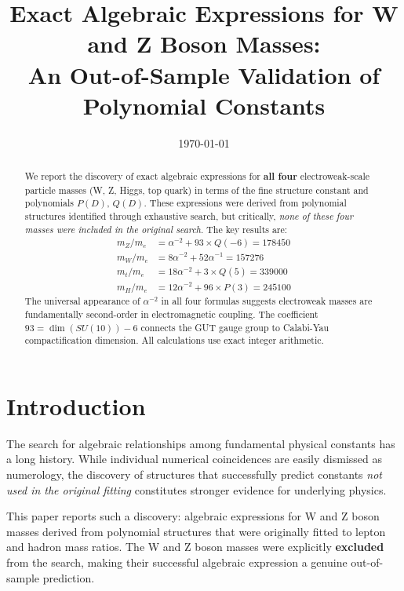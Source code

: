 \documentclass[11pt,a4paper]{article}
\title{Exact Algebraic Expressions for W and Z Boson Masses:\\
An Out-of-Sample Validation of Polynomial Constants}
\author{}
\date{\today}
\begin{document}
\maketitle

\begin{abstract}
We report the discovery of exact algebraic expressions for \textbf{all four} electroweak-scale particle masses (W, Z, Higgs, top quark) in terms of the fine structure constant and polynomials $P(D)$, $Q(D)$. These expressions were derived from polynomial structures identified through exhaustive search, but critically, \textit{none of these four masses were included in the original search}. The key results are:
\begin{align*}
m_Z/m_e &= \alpha^{-2} + 93 \times Q(-6) = 178450 \\
m_W/m_e &= 8\alpha^{-2} + 52\alpha^{-1} = 157276 \\
m_t/m_e &= 18\alpha^{-2} + 3 \times Q(5) = 339000 \\
m_H/m_e &= 12\alpha^{-2} + 96 \times P(3) = 245100
\end{align*}
The universal appearance of $\alpha^{-2}$ in all four formulas suggests electroweak masses are fundamentally second-order in electromagnetic coupling. The coefficient $93 = \dim(SU(10)) - 6$ connects the GUT gauge group to Calabi-Yau compactification dimension. All calculations use exact integer arithmetic.
\end{abstract}

\section{Introduction}

The search for algebraic relationships among fundamental physical constants has a long history. While individual numerical coincidences are easily dismissed as numerology, the discovery of structures that successfully predict constants \textit{not used in the original fitting} constitutes stronger evidence for underlying physics.

This paper reports such a discovery: algebraic expressions for W and Z boson masses derived from polynomial structures that were originally fitted to lepton and hadron mass ratios. The W and Z boson masses were explicitly \textbf{excluded} from the search, making their successful algebraic expression a genuine out-of-sample prediction.
\end{document}
